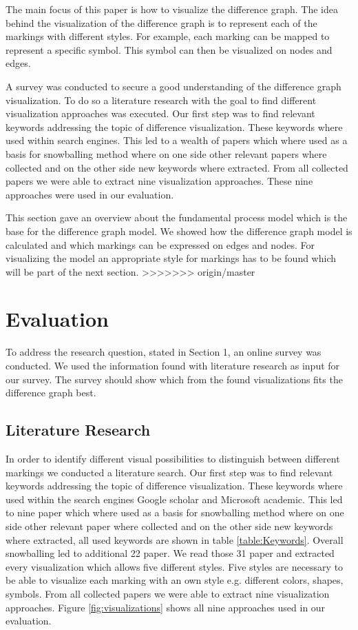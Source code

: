 \documentclass{llncs}
\begin{document}
\begin{keywords}
The main  focus of this paper is how to visualize the difference graph. The idea behind the visualization of the difference graph is to represent each of the markings with different styles. For example, each marking can be mapped to represent a specific symbol. This symbol can then be visualized on nodes and edges.

A survey was conducted to secure a good understanding of the difference graph visualization. To do so a literature research with the goal to find different visualization approaches was executed. Our first step was to find relevant keywords addressing the topic of difference visualization. These keywords where used within search engines. This led to a wealth of papers which where used as a basis for snowballing method where on one side other relevant papers where collected and on the other side new keywords where extracted. From all collected papers we were able to extract nine visualization approaches. These nine approaches were used in our evaluation.

This section gave an overview about the fundamental process model which is the base for the difference graph model. We showed how the difference graph model is calculated and which markings can be expressed on edges and nodes. For visualizing the model an appropriate style for markings has to be found which will be part of the next section.
>>>>>>> origin/master

\section{Evaluation} %
\label{sec:Evaluation} %
To address the research question, stated in Section 1, an online survey was conducted. We used the information found with literature research as input for our survey. The survey should show which from the found visualizations fits the difference graph best.

\subsection{Literature Research} %
\label{sec:LitResearch}
In order to identify different visual possibilities to distinguish between different markings we conducted a literature search. Our first step was to find relevant keywords addressing the topic of difference visualization. These keywords where used within the search engines Google scholar and Microsoft academic. This led to nine paper which where used as a basis for snowballing method where on one side other relevant paper where collected and on the other side new keywords where extracted, all used keywords are shown in table \ref{table:Keywords}. Overall snowballing led to additional 22 paper. We read those 31 paper and extracted every visualization which allows five different styles. Five styles are necessary to be able to visualize each marking with an own style e.g. different colors, shapes, symbols. From all collected papers we were able to extract nine visualization approaches. Figure \ref{fig:visualizations} shows all nine approaches used in our evaluation.


\end{keywords}
\end{document}
